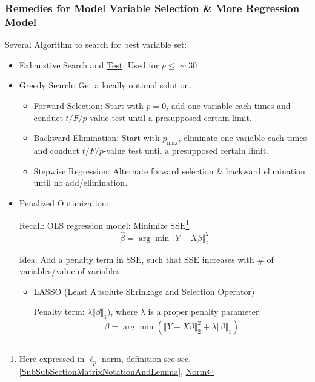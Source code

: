 \subsubsection{Remedies for Model Variable Selection \& More Regression Model}
    Several Algorithm to search for best variable set:
\begin{itemize}[topsep=2pt,itemsep=0pt]
\item Exhaustive Search and \hyperlink{ModelValidationCriteria}{Test}: Used for $ p\leq \sim 30 $
\item Greedy Search: Get a locally optimal solution.
\begin{itemize}[topsep=2pt,itemsep=2pt]
    \item Forward Selection: Start with $ p=0 $, add one variable each times and conduct $ t/F/p $-value test until a presupposed certain limit.
    \item Backward Elimination: Start with $ p_\mathrm{max} $, eliminate one variable each times and conduct $ t/F/p $-value test until a presupposed certain limit.
    \item Stepwise Regression: Alternate forward selection \& backward elimination until no add/elimination.
\end{itemize}

\item Penalized Optimization: 

Recall: OLS regression model: Minimize $ \mathrm{SSE}  $\footnote{Here expressed in $ \ell_p  $ norm, definition see sec.\ref{SubSubSectionMatrixNotationAndLemma}, \hyperlink{NormDefinition}{Norm}}
\begin{equation}
    \hat{\beta }=\arg\min \left\Vert Y-X\beta \right\Vert _2 ^2
\end{equation}

Idea: Add a penalty term in $ \mathrm{SSE} $, such that $ \mathrm{SSE} $ increases with \# of variables/value of variables.



\begin{itemize}[topsep=2pt,itemsep=2pt]  
\item LASSO (Least Absolute Shrinkage and Selection Operator)
     
Penalty term: $ \lambda\Vert \beta \Vert _1) $, where $ \lambda  $ is a proper penalty parameter.
\begin{equation}
    \hat{\beta }=\arg\min (\left\Vert Y-X\beta \right\Vert _2 ^2+\lambda\left\Vert \beta \right\Vert _1)
\end{equation}


\end{itemize}
\end{itemize}
